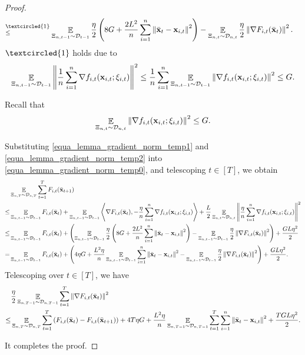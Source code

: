\documentclass{article}
\begin{document}
\begin{proof}
\begin{align}
\refabovecir{\le}{\textcircled{1}} & \EE_{ \Xi_{n,t-1} \sim \Dcal_{t-1} } \frac{\eta}{2}\lrincir{ 8 G + \frac{2L^2}{n}\sum_{i=1}^n \lrnorm{ \bar{\x}_t - \x_{i,t} }^2 }  - \EE_{ \Xi_{n,t} \sim \Dcal_{n,t} } \frac{\eta}{2} \lrnorm{\nabla F_{i,t}(\bar{\x}_t)}^2.
\end{align} $\textcircled{1}$ holds due to  
\begin{align}
\nonumber
\mathop{\mathbb{E}}_{ \Xi_{n,t-1} \sim \mathcal{D}_{t-1} }\left\lVert\frac{1}{n}\sum_{i=1}^n \nabla  f_{i,t}({\bf x}_{i,t};\xi_{i,t})\right\rVert^2 \le \frac{1}{n}\sum_{i=1}^n  \mathop{\mathbb{E}}_{ \Xi_{n,t-1} \sim \mathcal{D}_{t-1} }\left\lVert\nabla  f_{i,t}({\bf x}_{i,t};\xi_{i,t})\right\rVert^2 \le G.
\end{align}




Recall that
\begin{align}
\label{equa_lemma_gradient_norm_temp2}
\mathop{\mathbb{E}}_{ \Xi_{n,t} \sim \mathcal{D}_{n,t} }\left\lVert \nabla f_{i,t}({\bf x}_{i,t};\xi_{i,t})\right\rVert^2 \le G.
\end{align}

Substituting \eqref{equa_lemma_gradient_norm_temp1} and \eqref{equa_lemma_gradient_norm_temp2} into \eqref{equa_lemma_gradient_norm_temp0}, and telescoping $t\in[T]$, we obtain
\begin{align}
\nonumber
& \mathop{\mathbb{E}}_{ \Xi_{n,T} \sim \mathcal{D}_{n,T} } \sum_{t=1}^T F_{i,t}(\bar{{\bf x}}_{t+1}) \\ \nonumber
\le & \mathop{\mathbb{E}}_{ \Xi_{n,t-1} \sim \mathcal{D}_{t-1} } F_{i,t}(\bar{{\bf x}}_t) + \mathop{\mathbb{E}}_{ \Xi_{n,t-1} \sim \mathcal{D}_{t-1} }\left\langle\nabla F_{i,t}(\bar{{\bf x}}_t), -\frac{\eta}{n}\sum_{i=1}^n \nabla f_{i,t}({\bf x}_{i,t};\xi_{i,t}) \right\rangle + \frac{L}{2} \mathop{\mathbb{E}}_{ \Xi_{n,t} \sim \mathcal{D}_{n,t} }\left\lVert\frac{\eta}{n}\sum_{i=1}^n \nabla f_{i,t}({\bf x}_{i,t};\xi_{i,t})\right\rVert^2 \\ \nonumber
\le & \mathop{\mathbb{E}}_{ \Xi_{n,t-1} \sim \mathcal{D}_{t-1} } F_{i,t}(\bar{{\bf x}}_t) + \left(  \mathop{\mathbb{E}}_{ \Xi_{n,t-1} \sim \mathcal{D}_{t-1} } \frac{\eta}{2}\left(  8 G + \frac{2L^2}{n}\sum_{i=1}^n \left\lVert \bar{{\bf x}}_t - {\bf x}_{i,t} \right\rVert^2  \right)  - \mathop{\mathbb{E}}_{ \Xi_{n,t-1} \sim \mathcal{D}_{t-1} } \frac{\eta}{2} \left\lVert\nabla F_{i,t}(\bar{{\bf x}}_t)\right\rVert^2  \right) + \frac{GL\eta^2}{2} \\ \nonumber
= & \mathop{\mathbb{E}}_{ \Xi_{n,t-1} \sim \mathcal{D}_{t-1} } F_{i,t}(\bar{{\bf x}}_t) + \left(   4\eta  G + \frac{ L^2 \eta}{n}\mathop{\mathbb{E}}_{ \Xi_{n,t-1} \sim \mathcal{D}_{t-1} }\sum_{i=1}^n \left\lVert \bar{{\bf x}}_t - {\bf x}_{i,t} \right\rVert^2   - \mathop{\mathbb{E}}_{ \Xi_{n,t-1} \sim \mathcal{D}_{t-1} } \frac{\eta}{2} \left\lVert\nabla F_{i,t}(\bar{{\bf x}}_t)\right\rVert^2  \right) + \frac{GL\eta^2}{2}.
\end{align} Telescoping over $t\in[T]$, we have
\begin{align}
& \frac{\eta}{2} \mathop{\mathbb{E}}_{ \Xi_{n,T-1} \sim \mathcal{D}_{n,T-1} }\sum_{t=1}^T \left\lVert\nabla F_{i,t}(\bar{{\bf x}}_t)\right\rVert^2 \\ \nonumber
\le & \mathop{\mathbb{E}}_{ \Xi_{n,T} \sim \mathcal{D}_{n,T} } \sum_{t=1}^T  \left( F_{i,t}(\bar{{\bf x}}_t) - F_{i,t}(\bar{{\bf x}}_{t+1}) \right) + 4T  \eta G + \frac{ L^2 \eta}{n}\mathop{\mathbb{E}}_{ \Xi_{n,T-1} \sim \mathcal{D}_{n,T-1} }\sum_{t=1}^T\sum_{i=1}^n \left\lVert \bar{{\bf x}}_t - {\bf x}_{i,t} \right\rVert^2 + \frac{TGL\eta^2}{2}.
\end{align} 





It completes the proof.
\end{proof}
\end{document}
